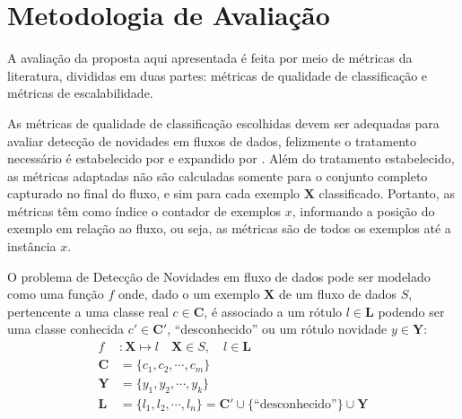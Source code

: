 \section{Metodologia de Avaliação}\label{sec:avaliacao}


A avaliação da proposta aqui apresentada é feita por meio de métricas da
literatura, divididas em duas partes: métricas de qualidade de classificação
e métricas de escalabilidade.

As métricas de qualidade de classificação escolhidas devem ser adequadas para
avaliar detecção de novidades em fluxos de dados, felizmente o tratamento necessário é
estabelecido por  e expandido por
.
Além do tratamento estabelecido, as métricas adaptadas não são calculadas
somente para o conjunto completo capturado no final do fluxo, e sim para cada
exemplo $\mathbf{X}$ classificado.
Portanto, as métricas têm como índice o contador de exemplos $x$, informando a
posição do exemplo em relação ao fluxo, ou seja, as métricas são de todos os
exemplos até a instância $x$.

\begin{definition}
  O problema de Detecção de Novidades em fluxo de dados pode ser modelado como
  uma função $f$ onde, dado o um exemplo $\mathbf{X}$ de um fluxo de dados $S$,
  pertencente a uma classe real $c \in \mathbf{C}$, é associado a um rótulo $l
  \in \mathbf{L}$ podendo ser uma classe conhecida $c' \in \mathbf{C}'$, ``desconhecido''
  ou um rótulo novidade $y \in \mathbf{Y}$:
  \begin{align}
    f  &: \mathbf{X} \mapsto l  \quad \mathbf{X} \in S , \quad l \in \mathbf{L}\\
    \mathbf{C} &= \{ c_1, c_2, \cdots, c_m \}  \label{eq:classes} \\
    \mathbf{Y} &= \{ y_1, y_2, \cdots, y_k \}  \label{eq:novelies} \\
    \mathbf{L} &= \{ l_1, l_2, \cdots, l_n \} = \mathbf{C}' \cup \{ \text{``desconhecido''} \} \cup \mathbf{Y} \label{eq:labels} 
  \end{align}
\end{definition}

